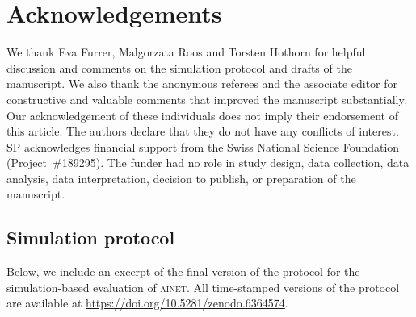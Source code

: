 \documentclass[a4paper, 11pt]{article}
\newcommand{\ainet}{\textsc{ainet}}
\begin{document}
\section*{Acknowledgements}
We thank Eva Furrer, Malgorzata Roos and Torsten Hothorn for
helpful discussion and comments on the simulation protocol and drafts of the
manuscript.
We also thank the anonymous referees and the associate editor for constructive
and valuable comments that improved the manuscript substantially.
Our acknowledgement of these individuals does not imply their endorsement of this article.
The authors declare that they do not have any conflicts of interest.
SP acknowledges financial support from the Swiss National Science Foundation
(Project~\#189295). The funder had no role in study design, data collection,
data analysis, data interpretation, decision to publish, or preparation of
the manuscript.

\begin{appendices}

\section{Simulation protocol}
\label{appendix:protocol}

Below, we include an excerpt of the final version of the protocol for the
simulation-based evaluation of \ainet{}. All time-stamped versions
of the protocol are available at \url{https://doi.org/10.5281/zenodo.6364574}.



% 

\end{appendices}



\end{document}
